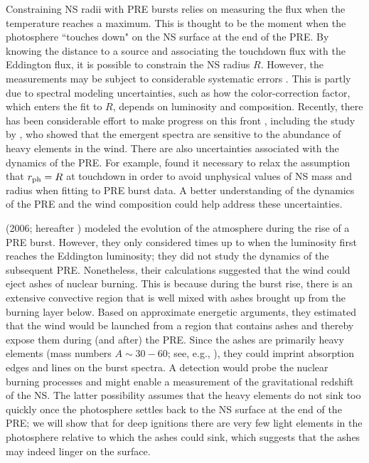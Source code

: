 \documentclass[apj,usenatbib, iop, twocolappendix]{emulateapj}
\begin{document}
Constraining NS radii with PRE bursts relies on measuring the flux when the temperature reaches a maximum. This is thought to be the moment when the photosphere ``touches down"  on the NS surface at the end of the PRE.  By knowing the distance to a source and associating the touchdown flux with the Eddington flux, it is possible to constrain the NS radius $R$.  However, the measurements may be subject to considerable systematic errors  \citep{Boutloukos:10, Steiner:10, Suleimanov:11, Miller:13, Medin:16, Miller:16}.  This is partly due to spectral modeling uncertainties, such as how the color-correction factor, which enters the fit to $R$, depends on luminosity and composition.  Recently, there has been considerable effort to make progress on this front \citep{Suleimanov:11, Suleimanov:12, Medin:16}, including the study by \citet{Nattila:15}, who showed that the emergent spectra are sensitive to the abundance of heavy elements in the wind. There are also uncertainties associated with the dynamics of the PRE.  For example, \citet{Steiner:10} found it necessary to relax the assumption that $r_{\rm ph}=R$ at touchdown in order to avoid unphysical values of NS mass and radius when fitting to PRE burst data.  A better understanding of the dynamics of the PRE and the wind composition could help address these uncertainties.   

\citeauthor{Weinberg:06} (2006; hereafter  ) modeled the evolution of the atmosphere during the rise of a PRE burst.  However, they only considered times up to when the luminosity first reaches the Eddington luminosity; they did not study the dynamics of the subsequent PRE.  Nonetheless, their calculations suggested that the wind could eject ashes of nuclear burning.  This is because during the burst rise, there is an extensive convective region that is well mixed with ashes brought up from the burning layer below. Based on approximate energetic arguments, they estimated that the wind would be launched from a region that contains ashes and thereby expose them during (and after) the PRE. Since the ashes are primarily heavy elements (mass numbers $A\sim 30-60$; see, e.g., ), they could imprint absorption edges and lines on the burst spectra. A detection would probe the nuclear burning processes and might enable a measurement of the gravitational redshift of the NS. The latter possibility assumes that the heavy elements do not sink too quickly once the photosphere settles back to the NS surface at the end of the PRE; we will show that for deep ignitions there are very few light elements in the photosphere relative to which the ashes could sink, which suggests that the ashes may indeed linger on the surface.
\end{document}
